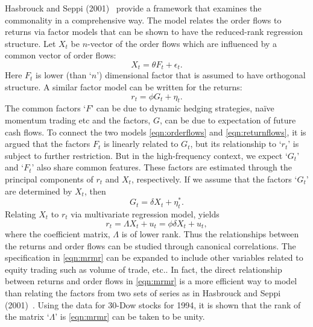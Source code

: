 Hasbrouck and Seppi (2001)~\cite{seppi2001} provide a framework that examines the commonality in a comprehensive way. The model relates the order flows to returns via factor models that can be shown to have the reduced-rank regression structure. Let $X_t$ be $n$-vector of the order flows which are influenced by a common vector of order flows:
	\begin{equation} \label{eqn:orderflows}
	X_t= \theta F_t + \epsilon_t.
	\end{equation}
Here $F_t$ is lower (than `$n$') dimensional factor that is assumed to have orthogonal structure. A similar factor model can be written for the returns:
	\begin{equation} \label{eqn:returnflows}
	r_t= \phi G_t + \eta_t.
	\end{equation}
The common factors `$F$' can be due to dynamic hedging strategies, na\"{i}ve momentum trading etc and the factors, $G$, can be due to expectation of future cash flows. To connect the two models \eqref{eqn:orderflows} and \eqref{eqn:returnflows}, it is argued that the factors $F_t$ is linearly related to $G_t$, but its relationship to `$r_t$' is subject to further restriction. But in the high-frequency context, we expect `$G_t$' and `$F_t$' also share common features. These factors are estimated through the principal components of $r_t$ and $X_t$, respectively. If we assume that the factors `$G_t$' are determined by $X_t$, then
	\begin{equation} \label{eqn:determinedfactors}
	G_t= \delta X_t + \eta_t^*.
	\end{equation}
Relating $X_t$ to $r_t$ via multivariate regression model, yields 
	\begin{equation} \label{eqn:mrmr}
	r_t= \Lambda X_t + u_t = \phi \delta X_t + u_t,
	\end{equation}
where the coefficient matrix, $\Lambda$ is of lower rank. Thus the relationships between the returns and order flows can be studied through canonical correlations. The specification in \eqref{eqn:mrmr} can be expanded to include other variables related to equity trading such as volume of trade, etc.. In fact, the direct relationship between returns and order flows in \eqref{eqn:mrmr} is a more efficient way to model than relating the factors from two sets of series as in Hasbrouck and Seppi (2001)~\cite{seppi2001}. Using the data for 30-Dow stocks for 1994, it is shown that the rank of the matrix `$\Lambda$' is \eqref{eqn:mrmr} can be taken to be unity. 



